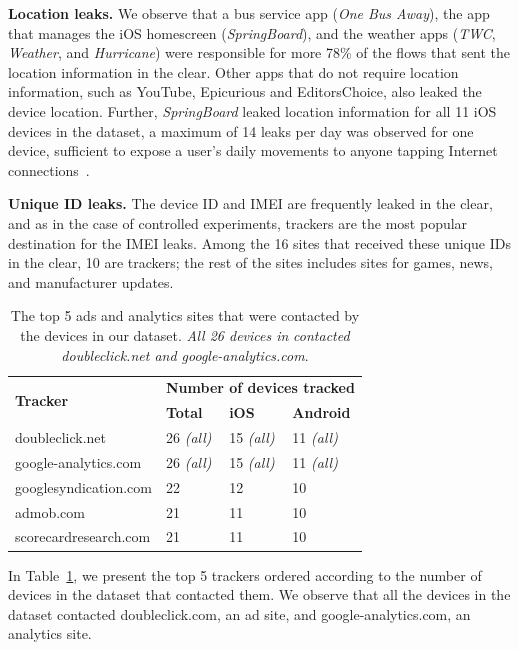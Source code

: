 \noindent\textbf{Location leaks.}
We observe that a bus service app (\emph{One Bus Away}), the app that manages the iOS homescreen (\emph{SpringBoard}), and the weather apps (\emph{TWC}, \emph{Weather}, and \emph{Hurricane}) were responsible for more 78\% of the flows that sent the location information in the clear. 
Other apps that do not require location information, such as YouTube, Epicurious and EditorsChoice, also leaked the device location. 
Further, \emph{SpringBoard} leaked location information for all 11 iOS devices in the \mobWild dataset, a maximum of 14 leaks per day was observed for one device, sufficient to expose a user's daily movements to anyone tapping Internet connections~\cite{nsa:globaltracking}. 

\noindent\textbf{Unique ID leaks.} 
The device ID and IMEI are frequently leaked in the clear, and as in the case of controlled experiments, trackers are the most popular destination for the IMEI leaks.  
Among the 16 sites that received these unique IDs in the clear, 10 are trackers; the rest of the sites includes sites for games, news, and manufacturer updates.

\begin{table}
\centering
\begin{small}
\begin{tabular}{|p{}|p{}|p{}|p{}|}
\hline
\multirow{2}{*}{\bf Tracker} & \multicolumn{3}{c|}{\bf Number of devices tracked}\tabularnewline
\cline{2-4}
                      &  {\bf Total} & {\bf iOS} & {\bf Android} \tabularnewline
\hline
doubleclick.net       & 26 {\em(all)} & 15 {\em(all)} & 11 {\em(all)} \tabularnewline
\hline
google-analytics.com  & 26 {\em(all)} & 15 {\em(all)}  & 11 {\em(all)} \tabularnewline
\hline
googlesyndication.com & 22 & 12 & 10 \tabularnewline
\hline
admob.com             & 21 & 11 & 10 \tabularnewline
\hline
scorecardresearch.com &  21 & 11 & 10 \tabularnewline
\hline
\end{tabular}
\end{small}
\caption{The top 5 ads and analytics sites that were contacted by the devices in our dataset.
\emph{All 26 devices in} \mobWild \emph{contacted doubleclick.net and google-analytics.com}.}
\vspace{\postfigspace}
\label{tab:top-trackers}
\end{table}

In Table~\ref{tab:top-trackers}, we present the top 5 trackers ordered according to the number of devices in the \mobWild dataset that contacted them.
We observe that all the devices in the \mobWild dataset contacted doubleclick.com, an ad site, and google-analytics.com, an analytics site. 

